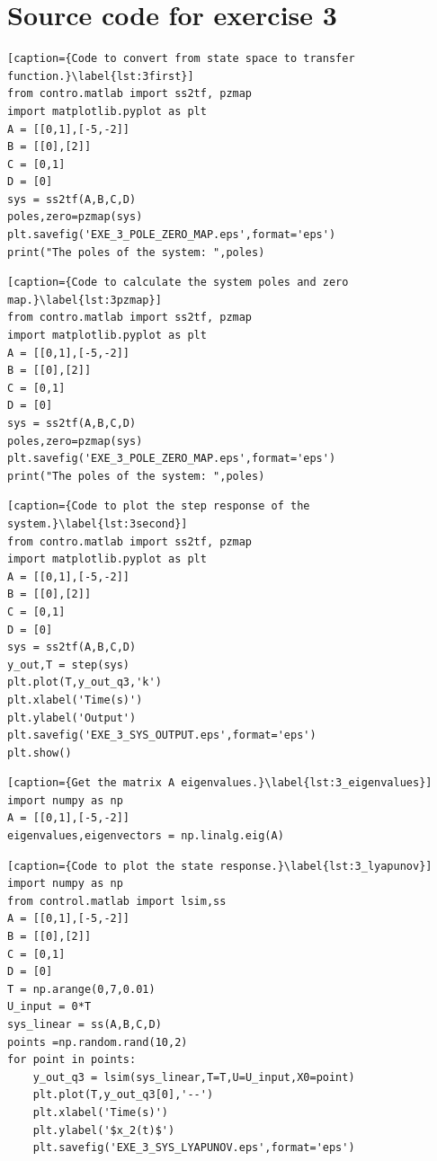 \documentclass[a4paper]{article}
\begin{document}
\section{Source code for exercise 3}
\begin{lstlisting}[caption={Code to convert from state space to transfer function.}\label{lst:3first}]
from contro.matlab import ss2tf, pzmap
import matplotlib.pyplot as plt
A = [[0,1],[-5,-2]]
B = [[0],[2]]
C = [0,1]
D = [0]
sys = ss2tf(A,B,C,D)
poles,zero=pzmap(sys)
plt.savefig('EXE_3_POLE_ZERO_MAP.eps',format='eps')
print("The poles of the system: ",poles)
\end{lstlisting}
\begin{lstlisting}[caption={Code to calculate the system poles and zero map.}\label{lst:3pzmap}]
from contro.matlab import ss2tf, pzmap
import matplotlib.pyplot as plt
A = [[0,1],[-5,-2]]
B = [[0],[2]]
C = [0,1]
D = [0]
sys = ss2tf(A,B,C,D)
poles,zero=pzmap(sys)
plt.savefig('EXE_3_POLE_ZERO_MAP.eps',format='eps')
print("The poles of the system: ",poles)
\end{lstlisting}
\begin{lstlisting}[caption={Code to plot the step response of the system.}\label{lst:3second}]
from contro.matlab import ss2tf, pzmap
import matplotlib.pyplot as plt
A = [[0,1],[-5,-2]]
B = [[0],[2]]
C = [0,1]
D = [0]
sys = ss2tf(A,B,C,D)
y_out,T = step(sys)
plt.plot(T,y_out_q3,'k')
plt.xlabel('Time(s)')
plt.ylabel('Output')
plt.savefig('EXE_3_SYS_OUTPUT.eps',format='eps')
plt.show()
\end{lstlisting}
\begin{lstlisting}[caption={Get the matrix A eigenvalues.}\label{lst:3_eigenvalues}]
import numpy as np
A = [[0,1],[-5,-2]]
eigenvalues,eigenvectors = np.linalg.eig(A)
\end{lstlisting}
\begin{lstlisting}[caption={Code to plot the state response.}\label{lst:3_lyapunov}]
import numpy as np
from control.matlab import lsim,ss
A = [[0,1],[-5,-2]]
B = [[0],[2]]
C = [0,1]
D = [0]
T = np.arange(0,7,0.01)
U_input = 0*T
sys_linear = ss(A,B,C,D)
points =np.random.rand(10,2)
for point in points:
    y_out_q3 = lsim(sys_linear,T=T,U=U_input,X0=point)
    plt.plot(T,y_out_q3[0],'--')
    plt.xlabel('Time(s)')
    plt.ylabel('$x_2(t)$')
    plt.savefig('EXE_3_SYS_LYAPUNOV.eps',format='eps')
\end{lstlisting}
\end{document}

